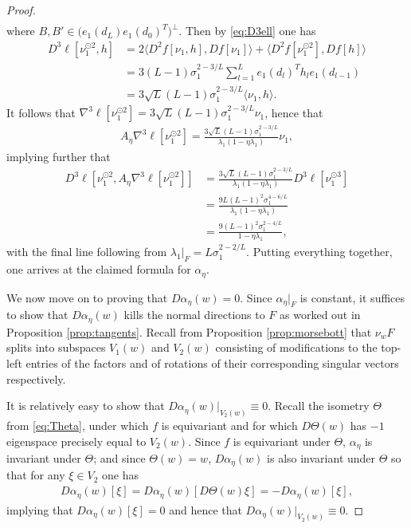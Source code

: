 \documentclass[10pt,a4paper]{amsart}
\begin{document}
\begin{proof}
\begin{align}
    \end{align}
    where $B,B'\in \big(e_1(d_L)e_1(d_0)^T\big)^{\perp}$. Then by \eqref{eq:D3ell} one has
    \begin{align}
    D^3\ell[\nu_1^{\odot 2},h] &= 2\langle D^2f[\nu_1,h],Df[\nu_1]\rangle + \langle D^2f[\nu_1^{\odot 2}],Df[h]\rangle\\&=3(L-1)\sigma_1^{2-3/L}\sum_{l=1}^Le_1(d_l)^Th_le_1(d_{l-1})\\&=3\sqrt{L}(L-1)\sigma_1^{2-3/L}\langle\nu_1,h\rangle.
    \end{align}
    It follows that $\nabla^3\ell[\nu_1^{\odot 2}] = 3\sqrt{L}(L-1)\sigma_1^{2-3/L}\nu_1$, hence that
    \begin{align}
        A_{\eta}\nabla^3\ell[\nu_1^{\odot2}] = \frac{3\sqrt{L}(L-1)\sigma_1^{2-3/L}}{\lambda_1(1-\eta\lambda_1)}\nu_1,
    \end{align}
    implying further that
    \begin{align}
        D^3\ell[\nu_1^{\odot 2},A_{\eta}\nabla^3\ell[\nu_1^{\odot 2}]] &=\frac{3\sqrt{L}(L-1)\sigma_1^{2-3/L}}{\lambda_1(1-\eta\lambda_1)}D^3\ell[\nu_1^{\odot 3}]\\&=\frac{9L(L-1)^2\sigma_1^{4-6/L}}{\lambda_1(1-\eta\lambda_1)}\\&=\frac{9(L-1)^2\sigma_1^{2-4/L}}{1-\eta\lambda_1},
    \end{align}
    with the final line following from $\lambda_1|_{F} = L\sigma_1^{2-2/L}$. Putting everything together, one arrives at the claimed formula for $\alpha_{\eta}$.

    We now move on to proving that $D\alpha_{\eta}(w) = 0$. Since $\alpha_{\eta}|_{F}$ is constant, it suffices to show that $D\alpha_{\eta}(w)$ kills the normal directions to $F$ as worked out in Proposition \ref{prop:tangents}. Recall from Proposition \ref{prop:morsebott} that $\nu_wF$ splits into subspaces $V_1(w)$ and $V_2(w)$ consisting of modifications to the top-left entries of the factors and of rotations of their corresponding singular vectors respectively.
    
    It is relatively easy to show that $D\alpha_{\eta}(w)|_{V_2(w)}\equiv 0$. Recall the isometry $\Theta$ from \eqref{eq:Theta}, under which $f$ is equivariant and for which $D\Theta(w)$ has $-1$ eigenspace precisely equal to $V_2(w)$. Since  $f$ is equivariant under $\Theta$, $\alpha_{\eta}$ is invariant under $\Theta$; and since $\Theta(w) = w$, $D\alpha_{\eta}(w)$ is also invariant under $\Theta$ so that for any $\xi\in V_2$ one has
    \begin{align}
    D\alpha_{\eta}(w)[\xi] = D\alpha_{\eta}(w)[D\Theta(w)\xi] = -D\alpha_{\eta}(w)[\xi],
    \end{align}
    implying that $D\alpha_{\eta}(w)[\xi] = 0$ and hence that $D\alpha_{\eta}(w)|_{V_2(w)}\equiv 0$.


\end{proof}
\end{document}

